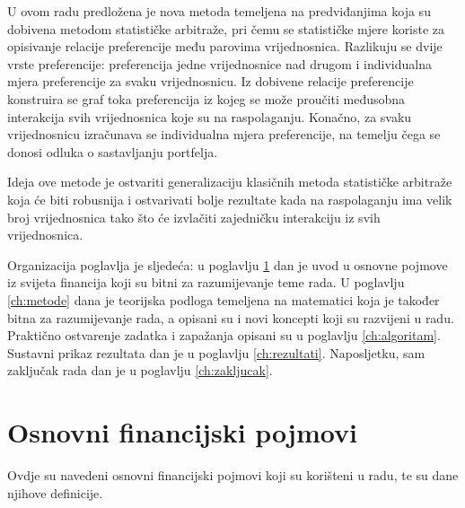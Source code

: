 \documentclass[lmodern, utf8, diplomski, numeric]{fer}
\begin{document}
  U ovom radu predložena je nova metoda temeljena na predviđanjima koja su dobivena metodom statističke arbitraže, pri čemu se statističke mjere koriste za opisivanje relacije preferencije među parovima vrijednosnica.
  Razlikuju se dvije vrste preferencije: preferencija jedne vrijednosnice nad drugom i individualna mjera preferencije za svaku vrijednosnicu.
  Iz dobivene relacije preferencije konstruira se graf toka preferencija iz kojeg se može proučiti međusobna interakcija svih vrijednosnica koje su na raspolaganju.
  Konačno, za svaku vrijednosnicu izračunava se individualna mjera preferencije, na temelju čega se donosi odluka o sastavljanju portfelja.
  
  Ideja ove metode je ostvariti generalizaciju klasičnih metoda statističke arbitraže koja će biti robusnija i ostvarivati bolje rezultate kada na raspolaganju ima velik broj vrijednosnica tako što će izvlačiti zajedničku interakciju iz svih vrijednosnica.
  
  Organizacija poglavlja je sljedeća: u poglavlju \ref{ch:osnovni-financijski-pojmovi} dan je uvod u osnovne pojmove iz svijeta financija koji su bitni za razumijevanje teme rada.
  U poglavlju \ref{ch:metode} dana je teorijska podloga temeljena na matematici koja je također bitna za razumijevanje rada, a opisani su i novi koncepti koji su razvijeni u radu.
  Praktično ostvarenje zadatka i zapažanja opisani su u poglavlju \ref{ch:algoritam}.
  Sustavni prikaz rezultata dan je u poglavlju \ref{ch:rezultati}.
  Naposljetku, sam zaključak rada dan je u poglavlju \ref{ch:zakljucak}.
  

  \chapter{Osnovni financijski pojmovi}
  \label{ch:osnovni-financijski-pojmovi}
  Ovdje su navedeni osnovni financijski pojmovi koji su korišteni u radu, te su dane njihove definicije.
  
\end{document}
